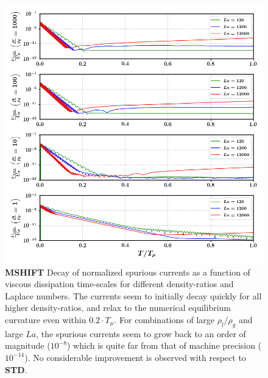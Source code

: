 \begin{figure}[h!]
    \centering
    \includegraphics[]{plots/static_drop/decay_daniel.png}
	\caption{\textbf{MSHIFT} Decay of normalized spurious currents as a function of viscous dissipation time-scales for different density-ratios and Laplace numbers. The currents seem to initially decay quickly for all higher density-ratios, and relax to the numerical equilibrium curvature even within $0.2 \cdot T_\mu$. For combinations of large $\rho_l / \rho_g$ and large $La$, the spurious currents seem to grow back to an order of magnitude ($10^{-8}$) which is quite far from that of machine precision ($10^{-14}$). No considerable improvement is observed with respect to \textbf{STD}. }   
    \label{decay_daniel}
\end{figure}

